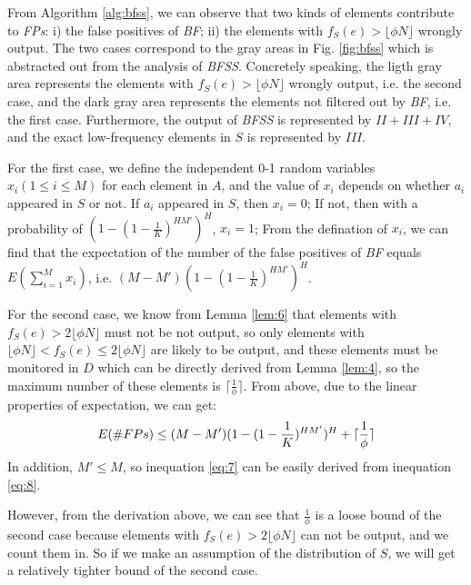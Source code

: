 \documentclass[conference]{IEEEtran}
\begin{document}
\begin{IEEEproof}
From Algorithm \ref{alg:bfss}, we can observe that two kinds of elements contribute to \emph{FPs}: i) the false positives of \emph{BF}; ii) the elements with $f_S(e)>\lfloor \phi N\rfloor$ wrongly output. The two cases correspond to the gray areas in Fig. \ref{fig:bfss} which is abstracted out from the analysis of \emph{BFSS}. Concretely speaking, the ligth gray area represents the elements with $f_S(e)>\lfloor \phi N\rfloor$ wrongly output, i.e. the second case, and the dark gray area represents the elements not filtered out by \emph{BF}, i.e. the first case. Furthermore, the output of \emph{BFSS} is represented by $II+III+IV$, and the exact low-frequency elements in $S$ is represented by $III$.\par
For the first case, we define the independent 0-1 random variables $x_i(1\leq i\leq M)$ for each element in $A$, and the value of $x_i$ depends on whether $a_i$ appeared in $S$ or not. If $a_i$ appeared in $S$, then $x_i=0$; If not, then with a probability of $(1-(1-\frac{1}{K})^{HM'})^H$, $x_i=1$; From the defination of $x_i$, we can find that the expectation of the number of the false positives of \emph{BF} equals $E(\sum_{i=1}^{M}x_i)$, i.e. $(M-M')(1-(1-\frac{1}{K})^{HM'})^H$.\par 
For the second case, we know from Lemma \ref{lem:6} that elements with $f_S(e)>2\lfloor \phi N\rfloor$ must not be not output, so only elements with $\lfloor \phi N\rfloor<f_S(e)\leq 2\lfloor \phi N\rfloor$ are likely to be output, and these elements must be monitored in $D$ which can be directly derived from Lemma \ref{lem:4}, so the maximum number of these elements is $\lceil\frac{1}{\phi}\rceil$. From above, due to the linear properties of expectation, we can get:
\begin{equation}\label{eq:8}
E(\#FPs)\leq (M-M')(1-(1-\frac{1}{K})^{HM'})^H+\lceil\frac{1}{\phi}\rceil\\
\end{equation}
\indent In addition, $M'\leq M$, so inequation \ref{eq:7} can be easily derived from inequation \ref{eq:8}.
\end{IEEEproof}

However, from the derivation above, we can see that $\frac{1}{\phi}$ is a loose bound of the second case because elements with $f_S(e)>2\lfloor \phi N\rfloor$ can not be output, and we count them in. So if we make an assumption of the distribution of $S$, we will get a relatively tighter bound of the second case.
\end{document}
